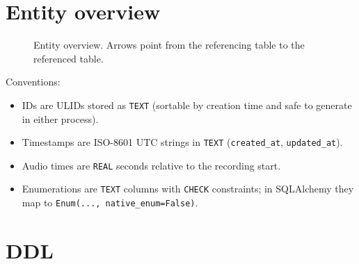 \documentclass[11pt]{article}
\begin{document}
{\small\setlength{\parskip}{0pt}\setcounter{tocdepth}{1}\tableofcontents}
\bigskip
\hypertarget{entity-overview}{%
\section{Entity overview}\label{entity-overview}}

\begin{figure}[!htbp]\centering
\resizebox{\ifdim\width>\linewidth\linewidth\else\width\fi}{!}{}
\caption{Entity overview. Arrows point from the referencing table to the referenced table.}
\end{figure}

Conventions:

\begin{itemize}
\tightlist
\item
  IDs are ULIDs stored as \texttt{TEXT} (sortable by creation time and safe to generate in either process).
\item
  Timestamps are ISO-8601 UTC strings in \texttt{TEXT} (\texttt{created\_\allowbreak{}at}, \texttt{updated\_\allowbreak{}at}).
\item
  Audio times are \texttt{REAL} seconds relative to the recording start.
\item
  Enumerations are \texttt{TEXT} columns with \texttt{CHECK} constraints; in SQLAlchemy they map to \texttt{Enum(.\allowbreak{}.\allowbreak{}.\allowbreak{},\allowbreak{} native\_\allowbreak{}enum=\allowbreak{}False)}.
\end{itemize}

\hypertarget{ddl}{%
\section{DDL}\label{ddl}}
\end{document}
